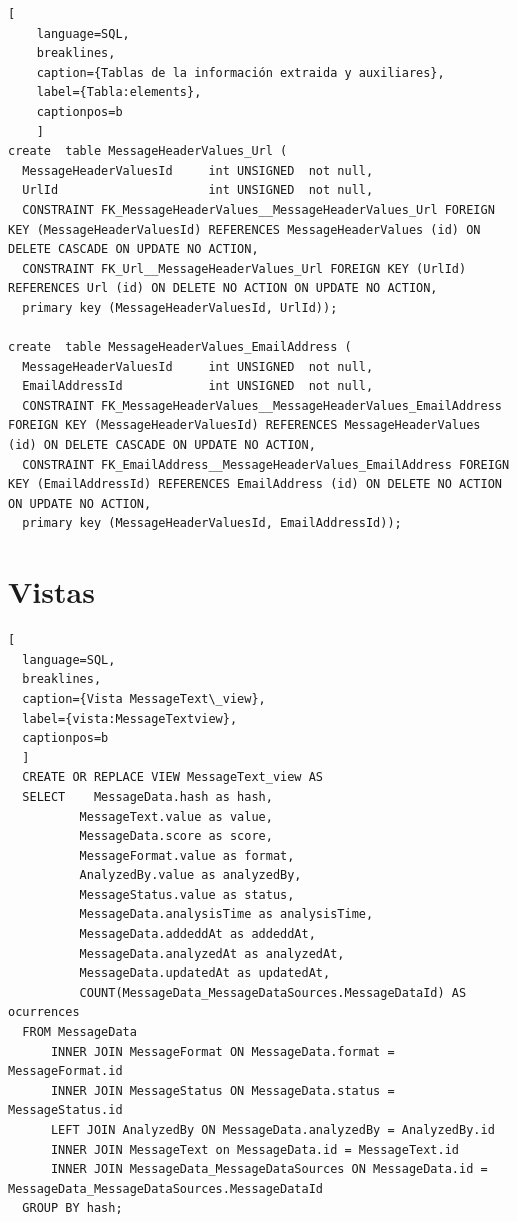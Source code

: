 \begin{lstlisting}[
    language=SQL,
    breaklines, 
    caption={Tablas de la información extraida y auxiliares}, 
    label={Tabla:elements}, 
    captionpos=b
    ]
create  table MessageHeaderValues_Url (
  MessageHeaderValuesId     int UNSIGNED  not null, 
  UrlId                     int UNSIGNED  not null,
  CONSTRAINT FK_MessageHeaderValues__MessageHeaderValues_Url FOREIGN KEY (MessageHeaderValuesId) REFERENCES MessageHeaderValues (id) ON DELETE CASCADE ON UPDATE NO ACTION,
  CONSTRAINT FK_Url__MessageHeaderValues_Url FOREIGN KEY (UrlId) REFERENCES Url (id) ON DELETE NO ACTION ON UPDATE NO ACTION,
  primary key (MessageHeaderValuesId, UrlId));

create  table MessageHeaderValues_EmailAddress (
  MessageHeaderValuesId     int UNSIGNED  not null, 
  EmailAddressId            int UNSIGNED  not null,
  CONSTRAINT FK_MessageHeaderValues__MessageHeaderValues_EmailAddress FOREIGN KEY (MessageHeaderValuesId) REFERENCES MessageHeaderValues (id) ON DELETE CASCADE ON UPDATE NO ACTION,
  CONSTRAINT FK_EmailAddress__MessageHeaderValues_EmailAddress FOREIGN KEY (EmailAddressId) REFERENCES EmailAddress (id) ON DELETE NO ACTION ON UPDATE NO ACTION,
  primary key (MessageHeaderValuesId, EmailAddressId));
\end{lstlisting}

\section{Vistas}
\renewcommand{\lstlistingname}{Vista}%

\begin{lstlisting}[
  language=SQL,
  breaklines, 
  caption={Vista MessageText\_view}, 
  label={vista:MessageTextview}, 
  captionpos=b
  ]
  CREATE OR REPLACE VIEW MessageText_view AS 
  SELECT	MessageData.hash as hash, 
          MessageText.value as value, 
          MessageData.score as score, 
          MessageFormat.value as format, 
          AnalyzedBy.value as analyzedBy, 
          MessageStatus.value as status, 
          MessageData.analysisTime as analysisTime, 
          MessageData.addeddAt as addeddAt, 
          MessageData.analyzedAt as analyzedAt, 
          MessageData.updatedAt as updatedAt,
          COUNT(MessageData_MessageDataSources.MessageDataId) AS ocurrences 
  FROM MessageData 
      INNER JOIN MessageFormat ON MessageData.format = MessageFormat.id
      INNER JOIN MessageStatus ON MessageData.status = MessageStatus.id
      LEFT JOIN AnalyzedBy ON MessageData.analyzedBy = AnalyzedBy.id
      INNER JOIN MessageText on MessageData.id = MessageText.id
      INNER JOIN MessageData_MessageDataSources ON MessageData.id = MessageData_MessageDataSources.MessageDataId
  GROUP BY hash;
\end{lstlisting}

